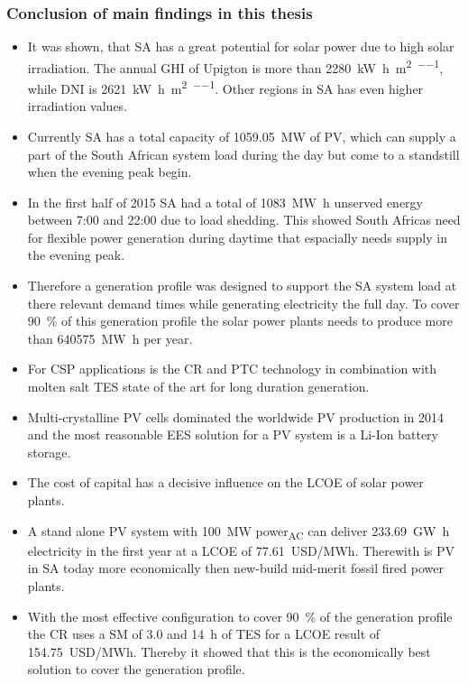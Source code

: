 \subsubsection{Conclusion of main findings in this thesis}
\begin{itemize}
\item It was shown, that SA has a great potential for solar power due to high solar irradiation. The annual GHI of Upigton is more than \SI{2280}{\kilo\watt\hour\per\square\metre\per\year}, while  DNI is \SI{2621}{\kilo\watt\hour\per\square\metre\per\year}. Other regions in SA has even higher irradiation values. 
\item Currently SA has a total capacity of \SI{1059.05}{\mega\watt} of PV, which can supply a part of the South African system load during the day but come to a standstill when the evening peak begin.
\item In the first half of 2015 SA had a total of \SI{1083}{\mega\watt\hour} unserved energy between 7:00 and 22:00 due to load shedding. This showed South Africas need for flexible power generation during daytime that espacially needs supply in the evening peak. 
\item Therefore a generation profile was designed to support the SA system load at there relevant demand times while generating electricity the full day. To cover \SI{90}{\percent} of this generation profile the solar power plants needs to produce more than \SI{640575}{\mega\watt\hour} per year.
\item For CSP applications is the CR and PTC technology in combination with molten salt TES state of the art for long duration generation.
\item Multi-crystalline PV cells dominated the worldwide PV production in 2014 and the most reasonable EES solution for a PV system is a Li-Ion battery storage.
\item The cost of capital has a decisive influence on the LCOE of solar power plants.
\item A stand alone PV system with \SI{100}{\mega\watt} power\textsubscript{AC} can deliver \SI{233.69}{\giga\watt\hour} electricity in the first year at a LCOE of \SI{77.61}{USD/MWh}. Therewith is PV in SA today more economically then new-build mid-merit fossil fired power plants.
\item With the most effective configuration to cover \SI{90}{\percent} of the generation profile the CR uses a SM of 3.0 and 14~h of TES for a LCOE result of \SI{154.75}{USD/MWh}. Thereby it showed that this is the economically best solution to cover the generation profile.

\end{itemize}
